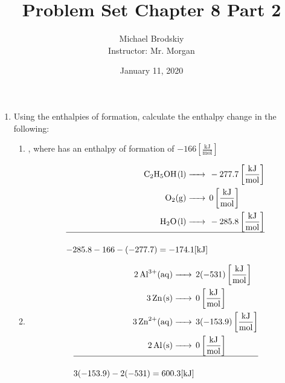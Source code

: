 \documentclass[12pt]{article}
\title{Problem Set Chapter 8 Part 2}
\date{January 11, 2020}
\author{Michael Brodskiy\\ \small Instructor: Mr. Morgan}
\begin{document}
\maketitle

\begin{enumerate}

  \item Using the enthalpies of formation, calculate the enthalpy change in the following:

    \begin{enumerate}

      \item {}, where  has an enthalpy of formation of $-166\left[ \frac{\si{\kilo\joule}}{\si{\mole}} \right]$

        \begin{equation}
          \begin{split}
            \ce{C2H5OH(l) ->}&\,-277.7\left[ \frac{\si{\kilo\joule}}{\si{\mole}} \right]\\
            \ce{O2(g) ->}&\,0\left[ \frac{\si{\kilo\joule}}{\si{\mole}} \right]\\
            \ce{H2O(l) ->}&\,-285.8\left[ \frac{\si{\kilo\joule}}{\si{\mole}} \right]\\
            \hline\\
            -285.8-166-(-277.7)=-174.1[\si{\kilo\joule}]\\
          \end{split}
          \label{1}
        \end{equation}

      \item {}

        \begin{equation}
          \begin{split}
            \ce{2Al^3+(aq) ->}&\,2(-531)\left[ \frac{\si{\kilo\joule}}{\si{\mole}} \right]\\
            \ce{3Zn(s) ->}&\,0\left[ \frac{\si{\kilo\joule}}{\si{\mole}} \right]\\
          \ce{3Zn^2+(aq) ->}&\,3(-153.9)\left[ \frac{\si{\kilo\joule}}{\si{\mole}} \right]\\
            \ce{2Al(s) ->}&\,0\left[ \frac{\si{\kilo\joule}}{\si{\mole}} \right]\\
            \hline\\
            3(-153.9)-2(-531)=600.3[\si{\kilo\joule}]\\
          \end{split}
          \label{2}
        \end{equation}


\end{enumerate}
\end{enumerate}
\end{document}

